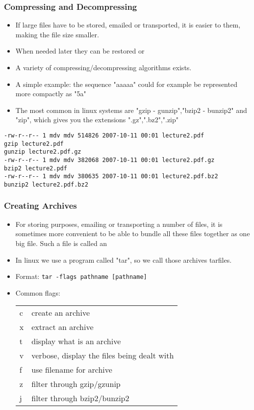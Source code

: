 \begin{frame}[fragile]\frametitle{Compressing and Decompressing}
\begin{itemize}
\item If large files have to be stored, emailed or transported, it is easier to  them, making the file size smaller. 
\item When needed later they can be restored or 
\item A variety of compressing/decompressing algorithms exists.
\item A simple example: the sequence "aaaaa" could for example be represented more compactly as "5a"
\item The most common in linux systems are "gzip - gunzip","bzip2 - bunzip2" and "zip", which gives you the extensions ".gz",".bz2",".zip"
\end{itemize}
\reslist
\codesmall
\begin{lstlisting}
-rw-r--r-- 1 mdv mdv 514826 2007-10-11 00:01 lecture2.pdf
gzip lecture2.pdf
gunzip lecture2.pdf.gz
-rw-r--r-- 1 mdv mdv 382068 2007-10-11 00:01 lecture2.pdf.gz
bzip2 lecture2.pdf
-rw-r--r-- 1 mdv mdv 380635 2007-10-11 00:01 lecture2.pdf.bz2
bunzip2 lecture2.pdf.bz2
\end{lstlisting}
\end{frame}

\begin{frame}[fragile]\frametitle{Creating Archives}
\begin{itemize}
\item For storing purposes, emailing or transporting a number of files, it is sometimes more convenient to be able to bundle all these files together as one big file. Such a file is called an 
\item In linux we use a program called "tar", so we call those archives tarfiles.
\item Format: \lstinline!tar -flags pathname [pathname]!
\item Common flags: 
\footnotesize{\begin{tabular}{l|l}
 c & create an archive\\
 x & extract an archive\\
t & display what is an archive\\
 v & verbose, display the files being dealt with\\
 f & use filename for archive\\
 z & filter through gzip/gzunip \\
j & filter through bzip2/bunzip2\\
\end{tabular}}
\end{itemize}
\end{frame}


